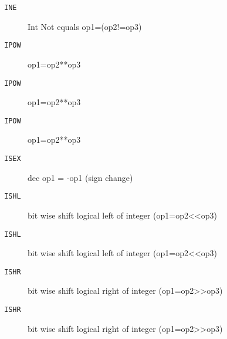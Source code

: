 
\begin{description}
\item[\texttt{INE        }]  Int Not equals op1=(op2!=op3)\\
\end{description}

\begin{description}
\item[\texttt{IPOW       }]  op1=op2**op3\\
\end{description}

\begin{description}
\item[\texttt{IPOW       }]  op1=op2**op3\\
\end{description}

\begin{description}
\item[\texttt{IPOW       }]  op1=op2**op3\\
\end{description}

\begin{description}
\item[\texttt{ISEX       }]  dec op1 = -op1 (sign change)\\
\end{description}

\begin{description}
\item[\texttt{ISHL       }]  bit wise shift logical left of integer (op1=op2<<op3)\\
\end{description}

\begin{description}
\item[\texttt{ISHL       }]  bit wise shift logical left of integer (op1=op2<<op3)\\
\end{description}

\begin{description}
\item[\texttt{ISHR       }]  bit wise shift logical right of integer (op1=op2>>op3)\\
\end{description}

\begin{description}
\item[\texttt{ISHR       }]  bit wise shift logical right of integer (op1=op2>>op3)\\
\end{description}

